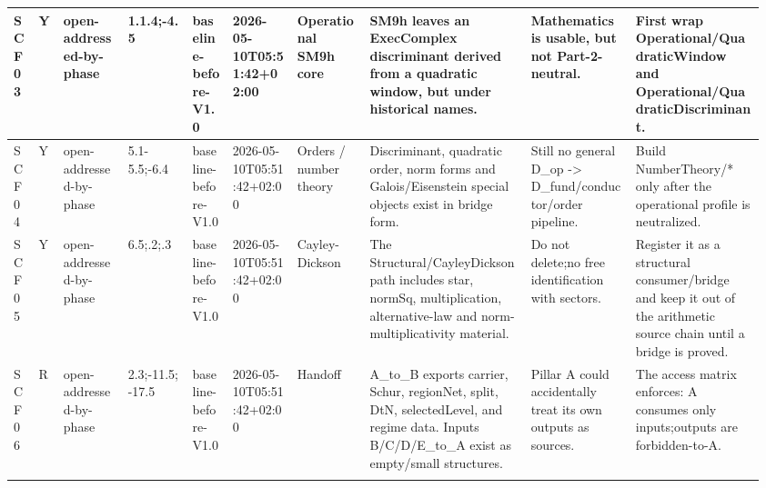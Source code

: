 \begin{longtable}{L{0.03\linewidth} L{0.026\linewidth} L{0.087\linewidth} L{0.085\linewidth} L{0.052\linewidth} L{0.085\linewidth} L{0.095\linewidth} L{0.205\linewidth} L{0.13\linewidth} L{0.165\linewidth}}
\hline
\addlinespace[0.24em]
SCF03 & Y & open-addressed-by-phase & 1.1.4;-4.5 & baseline-before-V1.0 & 2026-05-10T05:51:42+02:00 & Operational SM9h core & SM9h leaves an ExecComplex discriminant derived from a quadratic window, but under historical names. & Mathematics is usable, but not Part-2-neutral. & First wrap Operational/\allowbreak{}QuadraticWindow and Operational/\allowbreak{}QuadraticDiscriminant.\\
\hline
\addlinespace[0.24em]
SCF04 & Y & open-addressed-by-phase & 5.1-5.5;-6.4 & baseline-before-V1.0 & 2026-05-10T05:51:42+02:00 & Orders /\allowbreak{} number theory & Discriminant, quadratic order, norm forms and Galois/\allowbreak{}Eisenstein special objects exist in bridge form. & Still no general D\_op -> D\_fund/\allowbreak{}conductor/\allowbreak{}order pipeline. & Build NumberTheory/\allowbreak{}* only after the operational profile is neutralized.\\
\hline
\addlinespace[0.24em]
SCF05 & Y & open-addressed-by-phase & 6.5;.2;.3 & baseline-before-V1.0 & 2026-05-10T05:51:42+02:00 & Cayley-Dickson & The Structural/\allowbreak{}CayleyDickson path includes star, normSq, multiplication, alternative-law and norm-multiplicativity material. & Do not delete;\newline no free identification with sectors. & Register it as a structural consumer/\allowbreak{}bridge and keep it out of the arithmetic source chain until a bridge is proved.\\
\hline
\addlinespace[0.24em]
SCF06 & R & open-addressed-by-phase & 2.3;-11.5;-17.5 & baseline-before-V1.0 & 2026-05-10T05:51:42+02:00 & Handoff & A\_to\_B exports carrier, Schur, regionNet, split, DtN, selectedLevel, and regime data. Inputs B/\allowbreak{}C/\allowbreak{}D/\allowbreak{}E\_to\_A exist as empty/\allowbreak{}small structures. & Pillar A could accidentally treat its own outputs as sources. & The access matrix enforces: A consumes only inputs;\newline outputs are forbidden-to-A.\\
\hline
\addlinespace[0.24em]

\end{longtable}
